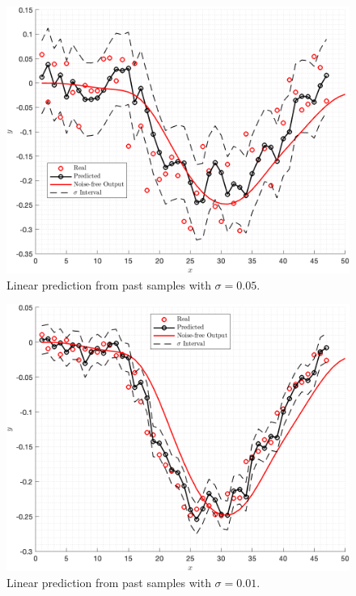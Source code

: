 \documentclass[11pt]{article}
\begin{document}

\begin{figure}[h!]
    \centering
    \includegraphics[width=\textwidth]{figure01.png}
    \caption{Linear prediction from past samples with \(\sigma = 0.05\).}
    \label{fig:fig01}
\end{figure}

\begin{figure}[h!]
    \centering
    \includegraphics[width=\textwidth]{figure02.png}
    \caption{Linear prediction from past samples with \(\sigma = 0.01\).}
    \label{fig:fig02}
\end{figure}
\end{document}
